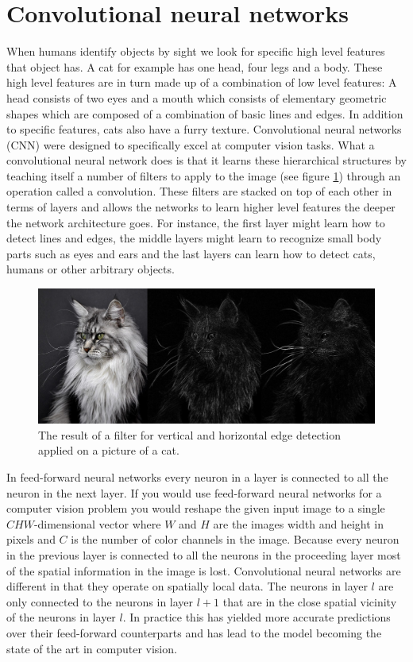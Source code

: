 \documentclass[a4paper, twoside]{article}
\begin{document}
\section{Convolutional neural networks}
When humans identify objects by sight we look for specific high level features that object has. A cat for example has one head, four legs and a body. These high level features are in turn made up of a combination of low level features: A head consists of two eyes and a mouth which consists of elementary geometric shapes which are composed of a combination of basic lines and edges. In addition to specific features, cats also have a furry texture. Convolutional neural networks (CNN) were designed to specifically excel at computer vision tasks. What a convolutional neural network does is that it learns these hierarchical structures by teaching itself a number of filters to apply to the image (see figure \ref{figkatter}) through an operation called a convolution. These filters are stacked on top of each other in terms of layers and allows the networks to learn higher level features the deeper the network architecture goes. For instance, the first layer might learn how to detect lines and edges, the middle layers might learn to recognize small body parts such as eyes and ears and the last layers can learn how to detect cats, humans or other arbitrary objects. \cite{cs231n}

\begin{figure}[h]
	\centering
  		\includegraphics[scale=0.33]{katter.png}
  	\caption{The result of a filter for vertical and horizontal edge detection applied on a picture of a cat.} \label{figkatter}
\end{figure}

In feed-forward neural networks every neuron in a layer is connected to all the neuron in the next layer. If you would use feed-forward neural networks for a computer vision problem you would reshape the given input image to a single $CHW$-dimensional vector where $W$ and $H$ are the images width and height in pixels and $C$ is the number of color channels in the image. Because every neuron in the previous layer is connected to all the neurons in the proceeding layer most of the spatial information in the image is lost. Convolutional neural networks are different in that they operate on spatially local data. The neurons in layer $l$ are only connected to the neurons in layer $l+1$ that are in the close spatial vicinity of the neurons in layer $l$. In practice this has yielded more accurate predictions over their feed-forward counterparts and has lead to the model becoming the state of the art in computer vision. \cite{cs231n} \cite{convmath} \cite{convarithmetic}
\end{document}
